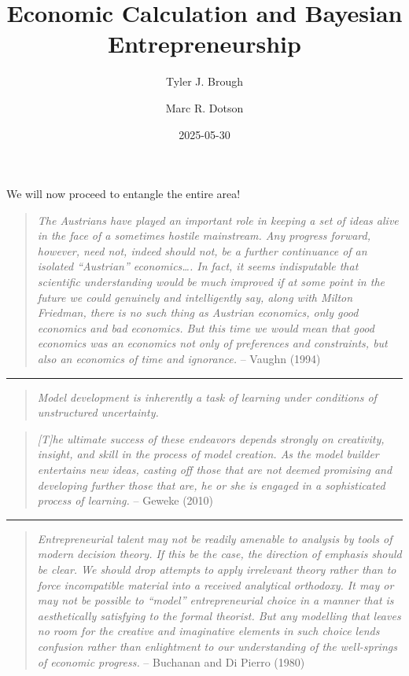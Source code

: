 \documentclass[
  letterpaper,
  DIV=11,
  numbers=noendperiod]{scrartcl}
\title{Economic Calculation and Bayesian Entrepreneurship}
\author{Tyler J. Brough \and Marc R. Dotson}
\date{2025-05-30}
\begin{document}
\maketitle


We will now proceed to entangle the entire area!

\newpage

\begin{quote}
\emph{The Austrians have played an important role in keeping a set of
ideas alive in the face of a sometimes hostile mainstream. Any progress
forward, however, need not, indeed should not, be a further continuance
of an isolated ``Austrian'' economics\ldots. In fact, it seems
indisputable that scientific understanding would be much improved if at
some point in the future we could genuinely and intelligently say, along
with Milton Friedman, there is no such thing as Austrian economics, only
good economics and bad economics. But this time we would mean that good
economics was an economics not only of preferences and constraints, but
also an economics of time and ignorance.} -- Vaughn (1994)
\end{quote}

\begin{center}\rule{0.5\linewidth}{0.5pt}\end{center}

\begin{quote}
\emph{Model development is inherently a task of learning under
conditions of unstructured uncertainty.}
\end{quote}

\begin{quote}
\emph{{[}T{]}he ultimate success of these endeavors depends strongly on
creativity, insight, and skill in the process of model creation. As the
model builder entertains new ideas, casting oﬀ those that are not deemed
promising and developing further those that are, he or she is engaged in
a sophisticated process of learning.} -- Geweke (2010)
\end{quote}

\begin{center}\rule{0.5\linewidth}{0.5pt}\end{center}

\begin{quote}
\emph{Entrepreneurial talent may not be readily amenable to analysis by
tools of modern decision theory. If this be the case, the direction of
emphasis should be clear. We should drop attempts to apply irrelevant
theory rather than to force incompatible material into a received
analytical orthodoxy. It may or may not be possible to ``model''
entrepreneurial choice in a manner that is aesthetically satisfying to
the formal theorist. But any modelling that leaves no room for the
creative and imaginative elements in such choice lends confusion rather
than enlightment to our understanding of the well-springs of economic
progress.} -- Buchanan and Di Pierro (1980)
\end{quote}
\end{document}
